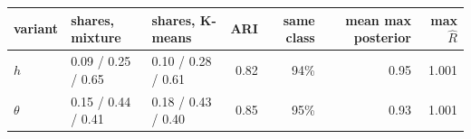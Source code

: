\begin{tabular}{lllrrrr}
\toprule
variant & shares, mixture & shares, K-means & ARI & same class & mean max posterior & max $\hat R$ \\
\midrule
$h$ & 0.09 / 0.25 / 0.65 & 0.10 / 0.28 / 0.61 & 0.82 & 94\% & 0.95 & 1.001 \\
$\theta$ & 0.15 / 0.44 / 0.41 & 0.18 / 0.43 / 0.40 & 0.85 & 95\% & 0.93 & 1.001 \\
\bottomrule
\end{tabular}

